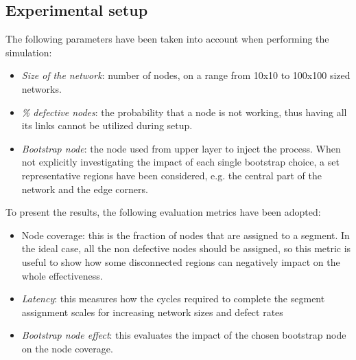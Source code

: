 \subsection{Experimental setup}
The following parameters have been taken into account when
performing the \disr{} simulation:
\begin{itemize}
\item {\emph{Size of the network}}: number of nodes, on a range from
10x10 to 100x100 sized networks. 
\item {\emph{\% defective nodes}}: the probability that a node is not
working, thus having all its links cannot be utilized during \disr{} setup.  
\item {\emph{Bootstrap node}}: the node used from upper layer 
to inject the \disr{} process. When not explicitly investigating the
impact of each single bootstrap choice, a set representative regions have been
considered, e.g. the central part of the network and the edge corners.
\end{itemize}
To present the results, the following evaluation metrics have been adopted:
\begin{itemize}
\item{Node coverage}: this is the fraction of nodes that
are assigned to a segment. In the ideal case, all the non defective
nodes should be assigned, so this metric is useful to show how some
disconnected regions can negatively impact on the whole \disr{}
effectiveness.
\item{\emph{Latency}}: this measures how the cycles required to complete the
segment assignment scales for increasing network sizes and defect rates
\item{\emph{Bootstrap node effect}}: this evaluates the impact of the chosen
bootstrap node on the node coverage.
\end{itemize}


